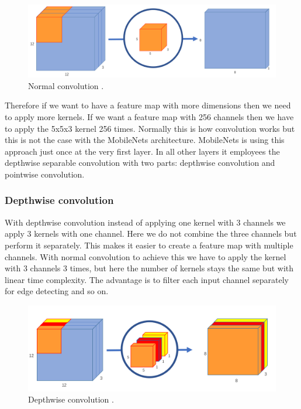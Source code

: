 \begin{figure}[!htb]
    \centering
    \includegraphics[width=1\textwidth]{figures/normalconvolution2.png}
    \caption{Normal convolution \cite{normalconvolution}.}
    \label{fig:normconv}
\end{figure}

Therefore if we want to have a feature map with more dimensions then we need to apply more kernels. If we want a feature map with 256 channels then we have to apply the 5x5x3 kernel 256 times. Normally this is how convolution works but this is not the case with the MobileNets architecture. MobileNets is using this approach just once at the very first layer. In all other layers it employees the depthwise separable convolution with two parts: depthwise convolution and pointwise convolution. 



\subsubsection{Depthwise convolution}
 

With depthwise convolution instead of applying one kernel with 3 channels we apply 3 kernels with one channel. Here we do not combine the three channels but perform it separately. This makes it easier to create a feature map with multiple channels. With normal convolution to achieve this we have to apply the kernel with 3 channels 3 times, but here the number of kernels stays the same but with linear time complexity. 
The advantage is to filter each input channel separately for edge detecting and so on. 



\begin{figure}[!htb]
    \centering
    \includegraphics[width=1\textwidth]{figures/depthwise2.png}
    \caption{Depthwise convolution \cite{normalconvolution}.}
    \label{fig:depthconv}
\end{figure}

